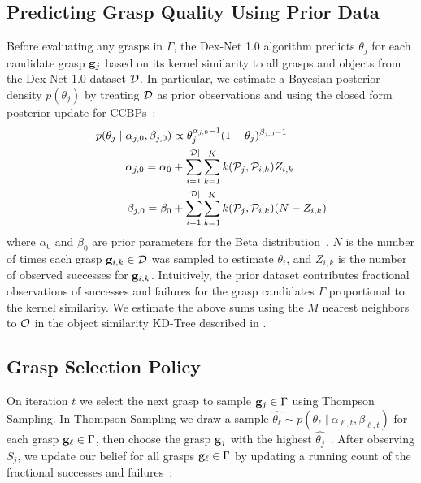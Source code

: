\subsection{Predicting Grasp Quality Using Prior Data}
Before evaluating any grasps in $\Gamma$, the Dex-Net 1.0 algorithm predicts $\theta_j$ for each candidate grasp $\mathbf{g}_j$ based on its kernel similarity to all grasps and objects from the Dex-Net 1.0 dataset $\mathcal{D}$.
In particular, we estimate a Bayesian posterior density $p(\theta_j)$ by treating $\mathcal{D}$ as prior observations and using the closed form posterior update for CCBPs~\cite{goetschalckx2011continuous}:
\begin{align}
 	p(\theta_j \mid \alpha_{j,0}, \beta_{j,0} ) &\propto \theta_j^{\alpha_{j,0}-1} (1 - \theta_j)^{\beta_{j,0}-1} \\
	\alpha_{j,0} = \alpha_{0} & + \sum \limits_{i=1}^{| \mathcal{D} |} \sum \limits_{k=1}^{K} k(\mathcal{P}_{j}, \mathcal{P}_{i, k}) Z_{i,k} \label{eq:alpha-prior} \\
	\beta_{j,0} = \beta_{0} & + \sum \limits_{i=1}^{| \mathcal{D} |} \sum \limits_{k=1}^{K}  k(\mathcal{P}_{j}, \mathcal{P}_{i,k}) (N - Z_{i,k}) \label{eq:beta-prior}
\end{align}
\noindent where $\alpha_{0}$ and $\beta_{0}$ are prior parameters for the Beta distribution~\cite{laskey2015bandits}, $N$ is the number of times each grasp $\mathbf{g}_{i,k} \in \mathcal{D}$ was sampled to estimate $\theta_i$, and $Z_{i,k}$ is the number of observed successes for $\mathbf{g}_{i,k}$. 
Intuitively, the prior dataset contributes fractional observations of successes and failures for the grasp candidates $\Gamma$ proportional to the kernel similarity.
We estimate the above sums using the $M$ nearest neighbors to $\mathcal{O}$ in the object similarity KD-Tree described in . 

\subsection{Grasp Selection Policy}
On iteration $t$ we select the next grasp to sample $\mathbf{g}_j \in \Gamma$ using Thompson Sampling.
In Thompson Sampling we draw a sample $\hat{\theta_{\ell}} \sim p(\theta_{\ell} \mid \alpha_{\ell,t}, \beta_{\ell,t} )$ for each grasp $\mathbf{g}_{\ell} \in \Gamma$, then choose the grasp $\mathbf{g}_j$ with the highest $\hat{\theta_j}$~\cite{laskey2015bandits}.
After observing $S_{j}$, we update our belief for all grasps $\mathbf{g}_{\ell} \in \Gamma$ by updating a running count of the fractional successes and failures~\cite{goetschalckx2011continuous}:


